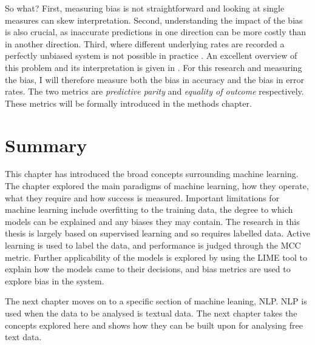 So what? First, measuring bias is not straightforward and looking at single measures can skew interpretation. Second, understanding the impact of the bias is also crucial, as inaccurate predictions in one direction can be more costly than in another direction. Third, where different underlying rates are recorded a perfectly unbiased system is not possible in practice \parencite{kleinberg2016inherent}. An excellent overview of this problem and its interpretation is given in \parencite{hellman2020measuring}. For this research and measuring the bias, I will therefore measure both the bias in accuracy and the bias in error rates. The two metrics are \emph{predictive parity} and \emph{equality of outcome} respectively. These metrics will be formally introduced in the methods chapter.  



\section{Summary}

This chapter has introduced the broad concepts surrounding machine learning. The chapter explored the main paradigms of machine learning, how they operate, what they require and how success is measured. Important limitations for machine learning include overfitting to the training data, the degree to which models can be explained and any biases they may contain. The research in this thesis is largely based on supervised learning and so requires labelled data. Active learning is used to label the data, and performance is judged through the MCC metric. Further applicability of the models is explored by using the LIME tool to explain how the models came to their decisions, and bias metrics are used to explore bias in the system.

The next chapter moves on to a specific section of machine leaning, NLP. NLP is used when the data to be analysed is textual data. The next chapter takes the concepts explored here and shows how they can be built upon for analysing free text data.
